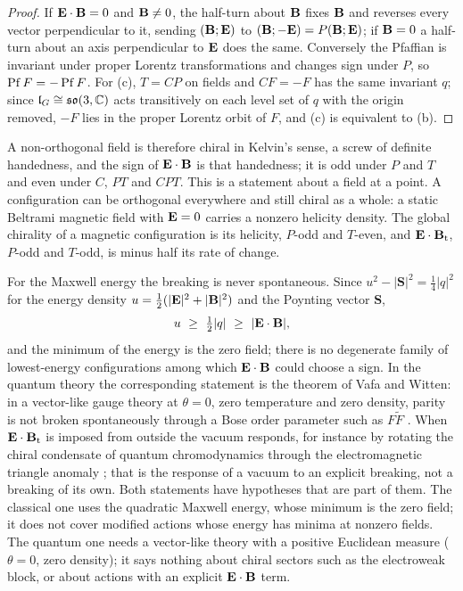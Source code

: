 \begin{proof}
If $\mathbf E\cdot\mathbf B=0$ and $\mathbf B\neq0$, the half-turn about $\mathbf B$ fixes $\mathbf B$ and reverses every vector perpendicular to it, sending $(\mathbf B;\mathbf E)$ to
$(\mathbf B;-\mathbf E)=P(\mathbf B;\mathbf E)$; if $\mathbf B=0$ a half-turn about an axis perpendicular to $\mathbf E$ does the same. Conversely the Pfaffian is invariant
under proper Lorentz transformations and changes sign under $P$, so $\operatorname{Pf} F=-\operatorname{Pf} F$. For (c), $T=CP$ on fields and $CF=-F$ has the same
invariant $q$; since $\mathfrak l_G\cong\mathfrak{so}(3,\mathbb{C})$ acts transitively on each level set of $q$ with the origin removed, $-F$ lies in the proper
Lorentz orbit of $F$, and (c) is equivalent to (b).
\end{proof}

A non-orthogonal field is therefore chiral in Kelvin's sense, a screw of definite handedness, and the sign of $\mathbf E\cdot\mathbf B$ is that
handedness; it is odd under $P$ and $T$ and even under $C$, $PT$ and $CPT$. This is a statement about a field at a point. A configuration
can be orthogonal everywhere and still chiral as a whole: a static Beltrami magnetic field with $\mathbf E=0$ carries a nonzero helicity
density. The global chirality of a magnetic configuration is its helicity, $P$-odd and $T$-even, and $\mathbf E\cdot\mathbf B_{\rm t}$, $P$-odd and
$T$-odd, is minus half its rate of change.

For the Maxwell energy the breaking is never spontaneous. Since $u^2-|\mathbf S|^2=\tfrac14|q|^2$ for the energy density $u=\tfrac12(|\mathbf E|^2+|\mathbf B|^2)$ and the
Poynting vector $\mathbf S$,
\begin{equation}
\label{eq:EBbound}
u\ \ge\ \tfrac12|q|\ \ge\ |\mathbf E\cdot\mathbf B| ,
\end{equation}
and the minimum of the energy is the zero field; there is no degenerate family of lowest-energy configurations among which
$\mathbf E\cdot\mathbf B$ could choose a sign. In the quantum theory the corresponding statement is the theorem of Vafa and Witten: in a vector-like
gauge theory at $\theta=0$, zero temperature and zero density, parity is not broken spontaneously through a Bose order parameter such
as $F\tilde F$ \cite{VafaWitten84}. When $\mathbf E\cdot\mathbf B_{\rm t}$ is imposed from outside the vacuum responds, for instance by rotating the
chiral condensate of quantum chromodynamics through the electromagnetic triangle anomaly \cite{CaoHuang15}; that is the response of a
vacuum to an explicit breaking, not a breaking of its own. Both statements have hypotheses that are part of them. The classical one uses the
quadratic Maxwell energy, whose minimum is the zero field; it does not cover modified actions whose energy has minima at nonzero fields. The quantum
one needs a vector-like theory with a positive Euclidean measure ($\theta=0$, zero density); it says nothing about chiral sectors such as the
electroweak block, or about actions with an explicit $\mathbf E\cdot\mathbf B$ term.

